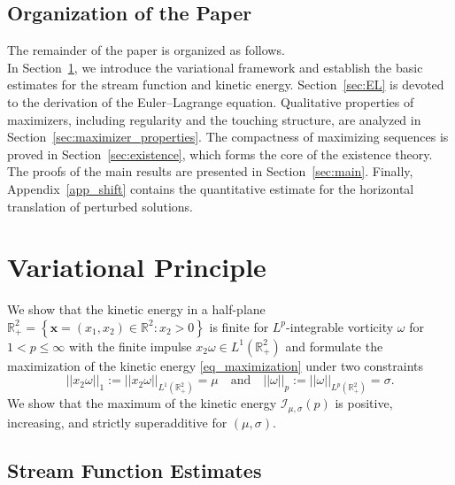 \documentclass[11pt]{amsart}
\theoremstyle{definition}
\theoremstyle{definition}
\numberwithin{equation}{section}
\newcommand{\0}{\emptyset}
\newcommand{\calI}{\mathcal I}
\begin{document}
 

	
	\subsection{Organization of the Paper}
	
	The remainder of the paper is organized as follows.\\

In Section~\ref{sec:prel}, we introduce the variational framework and establish the basic estimates for the stream function and kinetic energy.
Section~\ref{sec:EL} is devoted to the derivation of the Euler--Lagrange equation.
Qualitative properties of maximizers, including regularity and the touching structure, are analyzed in Section~\ref{sec:maximizer_properties}.
The compactness of maximizing sequences is proved in Section~\ref{sec:existence}, which forms the core of the existence theory.
The proofs of the main results are presented in Section~\ref{sec:main}.
Finally, Appendix~\ref{app_shift} contains the quantitative estimate for the horizontal translation of perturbed solutions.
	
	
 



	
	\section{Variational Principle}\label{sec:prel}
	
	We show that the kinetic energy in a half-plane $\mathbb{R}^{2}_{+}= \left\{ \mathbf{x} = (x_1, x_2) \in \mathbb{R}^2 : x_2 > 0 \right\}$ is finite for $L^{p}$-integrable vorticity $\omega$ for $1<p \leq \infty$ with the finite impulse $x_2\omega\in L^{1}(\mathbb{R}^{2}_{+})$ and formulate the maximization of the kinetic energy \eqref{eq_maximization} under two constraints $$||x_2\omega||_{1}:=||x_2\omega||_{L^1(\mathbb{R}^2_+)}=\mu \quad\mbox{and}\quad||\omega||_{p}:=||\omega||_{L^p(\mathbb{R}^2_+)}=\sigma.$$
	We show that the maximum of the kinetic energy $\calI_{\mu,\sigma}(p)$ is positive, increasing, and strictly superadditive for $(\mu,\sigma)$. 
	
	\subsection{Stream Function Estimates}
	
\end{document}
